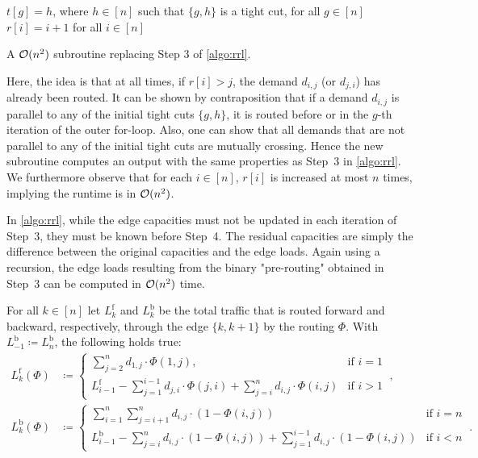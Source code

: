\begin{algorithm}[H]
	\begin{mdframed}[backgroundcolor=green!10,linecolor=white,innerleftmargin=25pt,leftmargin=-25pt,rightmargin=15pt]
		$t[g] = h$, where $h \in [n]$ such that $\{g, h\}$ is a tight cut, for all $g \in [n]$\;
		$r[i] = i+1$ for all $i \in [n]$\;
	\end{mdframed}
	\caption{A $\mathcal{O}(n^2)$ subroutine replacing Step 3 of \cref{algo:rrl}.}
	\label{algo:step3}
\end{algorithm}
Here, the idea is that at all times, if $r[i] > j$, the demand $d_{i,j}$ (or $d_{j, i}$) has already been routed.
It can be shown by contraposition that if a demand $d_{i,j}$ is parallel to any of the initial tight cuts $\{g, h\}$, it is routed before or in the $g$-th iteration of the outer for-loop.
Also, one can show that all demands that are not parallel to any of the initial tight cuts are mutually crossing.
Hence the new subroutine computes an output with the same properties as Step~3 in \cref{algo:rrl}.
We furthermore observe that for each $i \in [n]$, $r[i]$ is increased at most $n$ times, implying the runtime is in $\mathcal{O}(n^2)$.

In \cref{algo:rrl}, while the edge capacities must not be updated in each iteration of Step~3, they must be known before Step~4.
The residual capacities are simply the difference between the original capacities and the edge loads.
Again using a recursion, the edge loads resulting from the binary "pre-routing" obtained in Step~3 can be computed in $\mathcal{O}(n^2)$ time.

\begin{lemma}
	\label{lemma:link-loads}
	For all $k \in [n]$ let $L_k^\mathrm{f}$ and $L_k^\mathrm{b}$ be the total traffic that is routed forward and backward, respectively, through the edge $\{k, k+1\}$ by the routing $\Phi$. 
	With $L_{-1}^\mathrm{b} \coloneqq L_n^\mathrm{b}$, the following holds true:
		\begin{align}
		L_k^\mathrm{f}(\Phi) &\coloneqq \begin{cases}
			\sum_{j = 2}^n d_{1,j} \cdot \Phi(1, j), & \text{if } i = 1 \\
			L_{i-1}^\mathrm{f} - \sum_{j = 1}^{i-1} d_{j,i} \cdot \Phi(j, i) + \sum_{j = i}^{n} d_{i,j} \cdot \Phi(i, j) & \text{if } i > 1
		\end{cases} \ , \\
		L_k^\mathrm{b}(\Phi) &\coloneqq \begin{cases}
			\sum_{i = 1}^n \sum_{j = i+1}^n d_{i,j} \cdot (1 - \Phi(i, j)) & \text{if } i = n\\
			L_{i-1}^\mathrm{b} - \sum_{j = i}^{n} d_{i, j} \cdot (1 - \Phi(i, j)) + \sum_{j = 1}^{i-1} d_{i,j} \cdot(1 - \Phi(i, j)) & \text{if } i < n
		\end{cases} \ .
	\end{align}
\end{lemma}

